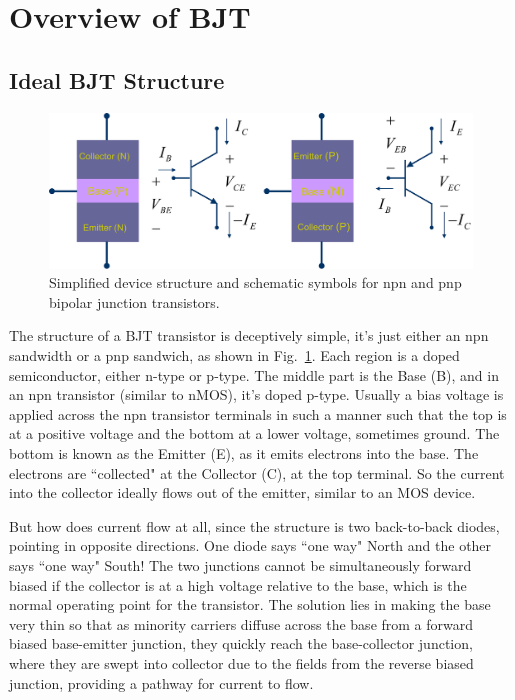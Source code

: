  



\section{Overview of BJT}



\subsection{Ideal BJT Structure}

\begin{figure}[tb]
\begin{center}
\includegraphics[width=.85\columnwidth]{slide2_bjt_overview}
\end{center}
\caption{Simplified device structure and schematic symbols for npn and pnp bipolar junction transistors. } \label{fig:slide2_bjt_overview}
\end{figure}

The structure of a BJT transistor is deceptively simple, it's just either an npn sandwidth or a pnp sandwich, as shown in Fig.~\ref{fig:slide2_bjt_overview}.  Each region is a doped semiconductor, either n-type or p-type.  The middle part is the Base (B), and in an npn transistor (similar to nMOS), it's doped p-type.  Usually a bias voltage is applied across the npn transistor terminals in such a manner such that the top is at a positive voltage and the bottom at a lower voltage, sometimes ground.  The bottom is known as the Emitter (E), as it emits electrons into the base.  The electrons are ``collected" at the Collector (C), at the top terminal.  So the current into the collector ideally flows out of the emitter, similar to an MOS device.


But how does current flow at all, since the structure is two back-to-back diodes, pointing in opposite directions.  One diode says ``one way" North and the other says ``one way" South!  The two junctions cannot be simultaneously forward biased if the collector is at a high voltage relative to the base, which is the normal operating point for the transistor.  The solution lies in making the base very thin so that as minority carriers diffuse across the base from a forward biased base-emitter junction, they quickly reach the base-collector junction, where they are swept into collector due to the fields from the reverse biased junction, providing a pathway for current to flow.  

